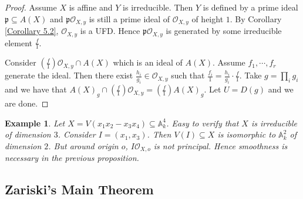 \documentclass{ctexart}
\newtheorem{example}{Example}[section]
\begin{document}
\begin{proof}
    Assume $X$ is affine and $Y$ is irreducible.
    Then $Y$ is defined by a prime ideal $\mathfrak{p} \subseteq A(X)$ and $\mathfrak{p}\mathcal{O}_{X, y}$ is still a prime ideal of $\mathcal{O}_{X, y}$ of height $1$.
    By Corollary \ref{Corollary 5.2}, $\mathcal{O}_{X, y}$ is a UFD.
    Hence $\mathfrak{p}\mathcal{O}_{X, y}$ is generated by some irreducible element $\frac{f}{1}$.
    \par
    Consider $(\frac{f}{1})\mathcal{O}_{X, y} \cap A(X)$ which is an ideal of $A(X)$.
    Assume $f_{1}, \cdots, f_{r}$ generate the ideal.
    Then there exist $\frac{h_{i}}{g_{i}}\in \mathcal{O}_{X, y}$ such that $\frac{f_{i}}{1} = \frac{h_{i}}{g_{i}} \cdot \frac{f}{1}$.
    Take $g = \prod_{i} g_{i}$ and we have that $A(X)_{g} \cap (\frac{f}{1})\mathcal{O}_{X, y} = (\frac{f}{1})A(X)_{g}$.
    Let $U = D(g)$ and we are done.
\end{proof}
\begin{example}
    Let $X = V(x_{1}x_{2} - x_{3}x_{4}) \subseteq \mathbb{A}_{k}^{4}$.
    Easy to verify that $X$ is irreducible of dimension $3$.
    Consider $I = (x_{1}, x_{3})$.
    Then $V(I) \subseteq X$ is isomorphic to $\mathbb{A}_{k}^{2}$ of dimension $2$.
    But around origin $o$, $I\mathcal{O}_{X, o}$ is not principal.
    Hence smoothness is necessary in the previous proposition.
\end{example}

\subsection{Zariski's Main Theorem}
\label{subsection:Smooth_Points_and_Smooth_Morphisms_Zariski's_Main_Theorem}
\end{document}
